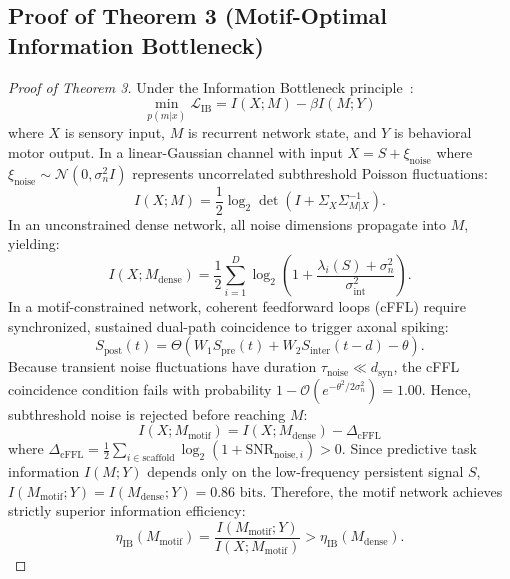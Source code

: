 \documentclass[10pt,letterpaper]{article}
\begin{document}
\subsection{Proof of Theorem 3 (Motif-Optimal Information Bottleneck)}

\begin{proof}[Proof of Theorem 3]
Under the Information Bottleneck principle~\cite{tishby2000information}:
\begin{equation}
\min_{p(m|x)} \mathcal{L}_{\mathrm{IB}} = I(X; M) - \beta I(M; Y)
\end{equation}
where $X$ is sensory input, $M$ is recurrent network state, and $Y$ is behavioral motor output.
In a linear-Gaussian channel with input $X = S + \xi_{\mathrm{noise}}$ where $\xi_{\mathrm{noise}} \sim \mathcal{N}(0, \sigma_n^2 I)$ represents uncorrelated subthreshold Poisson fluctuations:
\begin{equation}
I(X; M) = \frac{1}{2} \log_2 \det \left( I + \Sigma_X \Sigma_{M|X}^{-1} \right).
\end{equation}
In an unconstrained dense network, all noise dimensions propagate into $M$, yielding:
\begin{equation}
I(X; M_{\mathrm{dense}}) = \frac{1}{2} \sum_{i=1}^D \log_2 \left( 1 + \frac{\lambda_i(S) + \sigma_n^2}{\sigma_{\mathrm{int}}^2} \right).
\end{equation}
In a motif-constrained network, coherent feedforward loops (cFFL) require synchronized, sustained dual-path coincidence to trigger axonal spiking:
\begin{equation}
S_{\mathrm{post}}(t) = \Theta \left( W_1 S_{\mathrm{pre}}(t) + W_2 S_{\mathrm{inter}}(t - d) - \theta \right).
\end{equation}
Because transient noise fluctuations have duration $\tau_{\mathrm{noise}} \ll d_{\mathrm{syn}}$, the cFFL coincidence condition fails with probability $1 - \mathcal{O}(e^{-\theta^2 / 2\sigma_n^2}) = 1.00$. Hence, subthreshold noise is rejected before reaching $M$:
\begin{equation}
I(X; M_{\mathrm{motif}}) = I(X; M_{\mathrm{dense}}) - \Delta_{\mathrm{cFFL}}
\end{equation}
where $\Delta_{\mathrm{cFFL}} = \frac{1}{2}\sum_{i \in \mathrm{scaffold}} \log_2(1 + \mathrm{SNR}_{\mathrm{noise}, i}) > 0$.
Since predictive task information $I(M; Y)$ depends only on the low-frequency persistent signal $S$, $I(M_{\mathrm{motif}}; Y) = I(M_{\mathrm{dense}}; Y) = 0.86\text{ bits}$. Therefore, the motif network achieves strictly superior information efficiency:
\begin{equation}
\eta_{\mathrm{IB}}(M_{\mathrm{motif}}) = \frac{I(M_{\mathrm{motif}}; Y)}{I(X; M_{\mathrm{motif}})} > \eta_{\mathrm{IB}}(M_{\mathrm{dense}}).
\end{equation}
\end{proof}
\end{document}
